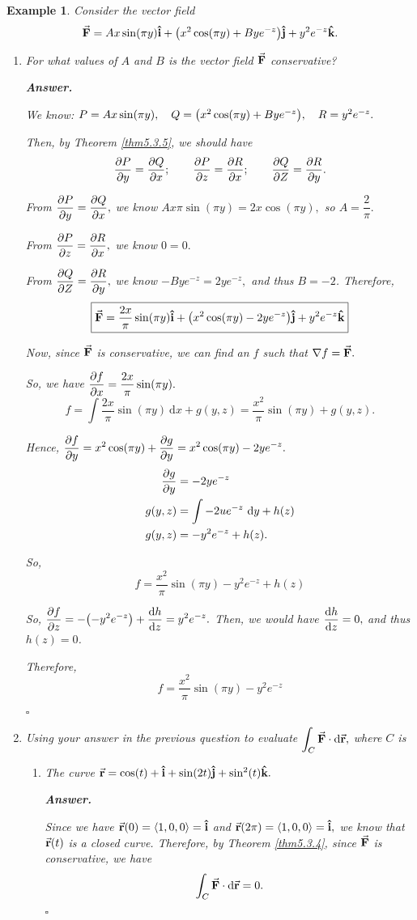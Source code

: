 \documentclass[12pt,a4paper]{article}
\newtheorem{eg}{Example}[subsection]
\newenvironment*{ans}{\par\indent\textbf{\textit{Answer. }}\par}{\par\hfill{$\square$}\par}
\def\dsst{\displaystyle}
\def\d{{\mathrm{d}}}
\def\dx{\d x}
\def\dy{\d y}
\def\intC{\dsst\int_C}
\def\vecr{\va{{\textbf{r}}}}
\def\veci{\vu{\boldsymbol{\textbf{i}}}}
\def\vecj{\vu{\boldsymbol{\textbf{j}}}}
\def\veck{\vu{\boldsymbol{\textbf{k}}}}
\def\F{\va{\boldsymbol{\textbf{F}}}}
\begin{document}
\begin{eg} Consider the vector field \[\F=Ax\sin(\pi y)\veci+\qty(x^2\cos(\pi y)+Bye^{-z})\vecj+y^2e^{-z}\veck.\]
\begin{enumerate}
	\item For what values of $A$ and $B$ is the vector field $\F$ conservative? 
	\begin{ans}
		We know: $P=Ax\sin(\pi y),\quad Q=\qty(x^2\cos(\pi y)+Bye^{-z}),\quad R=y^2e^{-z}.$\par Then, by Theorem \ref{thm5.3.5}, we should have \[\pdv{P}{y}=\pdv{Q}{x};\qquad\pdv{P}{z}=\pdv{R}{x};\qquad\pdv{Q}{Z}=\pdv{R}{y}.\]\par From $\dsst\pdv{P}{y}=\pdv{Q}{x},$ we know $Ax\pi\sin(\pi y)=2x\cos(\pi y),$ so $A=\dfrac{2}{\pi}.$ \par From $\dsst\pdv{P}{z}=\pdv{R}{x},$ we know $0=0.$\par From $\dsst\pdv{Q}{Z}=\pdv{R}{y},$ we know $-Bye^{-z}=2ye^{-z},$ and thus $B=-2$. Therefore, \[\boxed{\F=\dfrac{2x}{\pi}\sin(\pi y)\veci+\qty(x^2\cos(\pi y)-2ye^{-z})\vecj+y^2e^{-z}\veck}\]\par Now, since $\F$ is conservative, we can find an $f$ such that $\nabla f=\F.$\par So, we have $\dsst\pdv{f}{x}=\dfrac{2x}{\pi}\sin(\pi y).$\[f=\int \dfrac{2x}{\pi}\sin(\pi y)\ \dx+g(y,z)=\dfrac{x^2}{\pi}\sin(\pi y)+g(y,z).\]\par Hence, $\dsst\pdv{f}{y}=x^2\cos(\pi y)+\pdv{g}{y}=x^2\cos(\pi y)-2ye^{-z}.$\[\begin{aligned}\pdv{g}{y}&=-2ye^{-z}\\g(y,z)&=\int-2ue^{-z}\ \dy+h(z)\\g(y,z)&=-y^2e^{-z}+h(z).\end{aligned}\]\par So, \[f=\dfrac{x^2}{\pi}\sin(\pi y)-y^2e^{-z}+h(z)\]\par So, $\dsst\pdv{f}{z}=-\qty(-y^2e^{-z})+\dv{h}{z}=y^2e^{-z}.$ Then, we would have $\dsst\dv{h}{z}=0,$ and thus $h(z)=0$.\par Therefore, \[\boxed{f=\dfrac{x^2}{\pi}\sin(\pi y)-y^2e^{-z}}\]
	\end{ans}
	\item Using your answer in the previous question to evaluate $\intC\F\cdot\d\vecr,$ where $C$ is 
	\begin{enumerate}
		\item The curve $\vecr=\cos(t)+\veci+\sin(2t)\vecj+\sin^2(t)\veck.$
		\begin{ans}
			Since we have $\vecr(0)=\langle1,0,0\rangle=\veci$ and $\vecr(2\pi)=\langle1,0,0\rangle=\veci,$ we know that $\vecr(t)$ is a closed curve. Therefore, by Theorem \ref{thm5.3.4}, since $\F$ is conservative, we have \[\intC\F\cdot\d\vecr=0.\]

\end{ans}
\end{enumerate}
\end{enumerate}
\end{eg}
\end{document}
